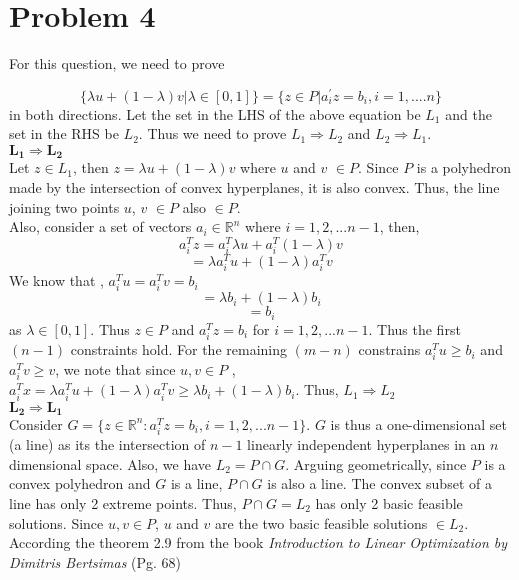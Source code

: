 \documentclass[11pt]{article}
\begin{document}
\section*{Problem 4}
For this question, we need to prove

\[ \{\lambda u + (1-\lambda) v | \lambda \in [0,1] \} = \{z \in P | a_{i}^{'}z =  b_i, i = 1,....n\} \]
in both directions. Let the set in the LHS of the above equation be $L_1$ and the set in the RHS be $L_2$. Thus we need to prove $L_1 \Rightarrow L_2$ and $L_2 \Rightarrow L_1$. \\

\underline{$\mathbf{L_1 \Rightarrow L_2}$} \\

Let $z \in L_1$, then $z = \lambda u + (1 - \lambda) v$ where $u$ and $v$ $\in P$. Since $P$ is a polyhedron made by the intersection of convex hyperplanes, it is also convex. Thus, the line joining two points $u$, $v$ $\in P$ also $\in P$. \\
Also, consider a set of vectors $a_i \in \mathbb{R}^n$ where $i = 1,2,...n-1$, then, 
\[ a_{i}^T z = a_{i}^T \lambda u + a_{i}^T (1 - \lambda)v \]
\[ = \lambda a_{i}^T u + (1-\lambda)a_{i}^T v\] 
We know that , $a_{i}^T u = a_{i}^T v = b_i$ \\
\[ = \lambda b_i + (1-\lambda) b_i\]
\[ = b_i \]
as $\lambda \in [0,1]$. Thus $z \in P$ and $a_{i}^T z = b_i$ for $i=1,2,...n-1$. Thus the first $(n-1)$ constraints hold. For the remaining $(m-n)$ constrains $a_{i}^T u \ge b_i$ and $a_{i}^T v \ge v$, we note that since $u,v \in P$ , $a_{i}^T x = \lambda a_{i}^T u + (1 - \lambda) a_{i}^T v \ge \lambda b_i + (1-\lambda) b_i$. Thus, $L_1 \Rightarrow L_2$\\

\underline{$\mathbf{L_2 \Rightarrow L_1}$} \\

Consider $G = \{ z \in \mathbb{R}^n : a_{i}^T z = b_i, i = 1,2,...n-1\}$. $G$ is thus a one-dimensional set (a line) as its the intersection of $n-1$ linearly independent hyperplanes in an $n$ dimensional space. Also, we have $L_2 = P \cap G$. Arguing geometrically, since $P$ is a convex polyhedron and $G$ is a line, $ P \cap G$ is also a line. The convex subset of a line has only 2 extreme points. Thus, $P \cap G = L_2$ has only 2 basic feasible solutions. Since $u,v \in P$, $u$ and $v$ are the two basic feasible solutions $\in L_2$. According the theorem 2.9 from the book \textit{Introduction to Linear Optimization by Dimitris Bertsimas} (Pg. 68)
\end{document}
